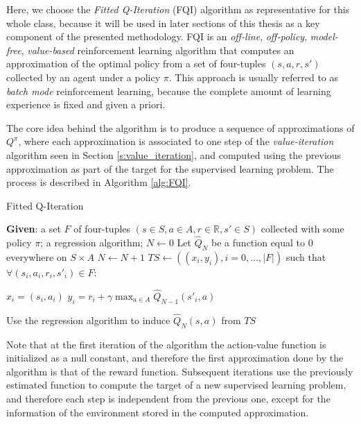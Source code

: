 Here, we choose the \textit{Fitted Q-Iteration} (FQI) \cite{ernst2005tree} 
algorithm as representative for this whole class, because it will be used in 
later sections of this thesis as a key component of the presented methodology.
FQI is an \textit{off-line}, \textit{off-policy}, \textit{model-free}, 
\textit{value-based} reinforcement learning algorithm that computes an 
approximation of the optimal policy from a set of four-tuples $(s, a, r, s')$
collected by an agent under a policy $\pi$.
This approach is usually referred to as \textit{batch mode} reinforcement 
learning, because the complete amount of learning experience is fixed and given
a priori.

The core idea behind the algorithm is to produce a sequence of approximations of
$Q^\pi$, where each approximation is associated to one step of the 
\textit{value-iteration} algorithm seen in Section \ref{s:value_iteration}, 
and computed using the previous approximation as part of the target for the 
supervised learning problem. The process is described in Algorithm \ref{alg:FQI}.
%
\begin{algorithm}
    \caption{Fitted Q-Iteration}
    \label{alg:FQI}
    \begin{algorithmic}
        \STATE \textbf{Given}: a set $F$ of four-tuples $(s \in S, a \in A, r \in \mathbb{R}, s' \in S)$ collected with some policy $\pi$; a regression algorithm;
        \STATE $N \leftarrow 0$
        \STATE Let $\hat{Q}_N$ be a function equal to $0$ everywhere on $S \times A$
        \REPEAT
	    \STATE $N \leftarrow N+1$
	    \STATE $TS \leftarrow ((x_i, y_i), i = 0, \dots, |F|)$ such that $\forall (s_i, a_i, r_i, s'_i) \in F$:
		\begin{ALC@g}
		    \STATE $x_i = (s_i, a_i)$
		    \STATE $y_i = r_i + \gamma \max_{a \in A} \hat{Q}_{N-1} (s'_i, a)$
		\end{ALC@g}
	    \STATE Use the regression algorithm to induce $\hat{Q}_N(s, a)$ from $TS$
    \end{algorithmic}
\end{algorithm}
%

Note that at the first iteration of the algorithm the action-value function is
initialized as a null constant, and therefore the first approximation done by 
the algorithm is that of the reward function.
Subsequent iterations use the previously estimated function to compute the 
target of a new supervised learning problem, and therefore each step is 
independent from the previous one, except for the information of the environment 
stored in the computed approximation. 

